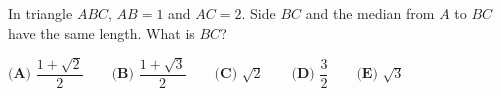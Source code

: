 In triangle $ABC$, $AB=1$ and $AC=2$. Side $BC$ and the median from $A$ to $BC$ have the same length. What is $BC$?

$\textbf{(A) }\dfrac{1+\sqrt2}{2}\qquad\textbf{(B) }\dfrac{1+\sqrt3}{2}\qquad\textbf{(C) }\sqrt2\qquad\textbf{(D) }\dfrac{3}{2}\qquad\textbf{(E) }\sqrt3$
